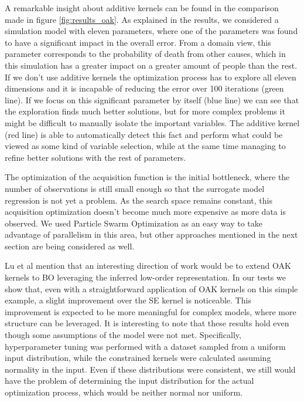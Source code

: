 \documentclass{IOS-Book-Article}
\begin{document}
	A remarkable insight about additive kernels can be found in the comparison made in figure \ref{fig:results_oak}. As explained in the results, we considered a simulation model with eleven parameters, where one of the parameters was found to have a significant impact in the overall error. From a domain view, this parameter corresponds to the probability of death from other causes, which in this simulation has a greater impact on a greater amount of people than the rest. If we don't use additive kernels the optimization process has to explore all eleven dimensions and it is incapable of reducing the error over 100 iterations (green line). If we focus on this significant parameter by itself (blue line) we can see that the exploration finds much better solutions, but for more complex problems it might be difficult to manually isolate the important variables. The additive kernel (red line) is able to automatically detect this fact and perform what could be viewed as some kind of variable selection, while at the same time managing to refine better solutions with the rest of parameters.
	
	The optimization of the acquisition function is the initial bottleneck, where the number of observations is still small enough so that the surrogate model regression is not yet a problem. As the search space remains constant, this acquisition optimization doesn't become much more expensive as more data is observed. We used Particle Swarm Optimization as an easy way to take advantage of parallelism in this area, but other approaches mentioned in the next section are being considered as well\cite{acquisition-functions}.
	
	Lu et al\cite{gp-additive-orthogonal} mention that an interesting direction of work would be to extend OAK kernels to BO leveraging the inferred low-order representation. In our tests we show that, even with a straightforward application of OAK kernels on this simple example, a slight improvement over the SE kernel is noticeable. This improvement is expected to be more meaningful for complex models, where more structure can be leveraged. It is interesting to note that these results hold even though some assumptions of the model were not met. Specifically, hyperparameter tuning was performed with a dataset sampled from a uniform input distribution, while the constrained kernels were calculated assuming normality in the input. Even if these distributions were consistent, we still would have the problem of determining the input distribution for the actual optimization process, which would be neither normal nor uniform.
	
\end{document}
